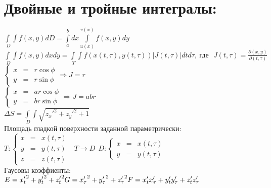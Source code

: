 \documentclass[12pt, a6paper]{extarticle}
\begin{document}
 \par \- \newline
\newpage
\section{Двойные и тройные интегралы:}
$\displaystyle \int\limits_{ \ D}\!\!\!\!\int{f(x,y)dD} = \int\limits_a^b{dx}\int\limits_{u(x)}^{v(x)}{f(x,y) dy} $ \\
$\displaystyle \int\limits_{ \ D}\!\!\!\!\int{f(x,y)dxdy} = \int\limits_{ \ T}\!\!\!\!\int{f(x(t,\tau),y(t,\tau))\left|J(t,\tau)\right|dtd\tau},\ \text{где}\ \ \ J(t,\tau) = \frac{\partial(x,y)}{\partial(t,\tau)} $ \\
$\displaystyle \left\{ \begin{array}{lll}
        									x & = & r\cos \phi \\
				             			y & = & r\sin \phi
					           \end{array}
							 \right. \Rightarrow J = r$ \\
$\displaystyle \left\{ \begin{array}{lll}
        									x & = & ar\cos \phi \\
				             			y & = & br\sin \phi
					           \end{array}
							 \right. \Rightarrow J = abr$ \\
$\displaystyle \Delta S = \int\limits_{ \ D}\!\!\!\!\int{\sqrt{{z_x'}^2+{z_y'}^2+1}} $ \\	
Площадь гладкой поверхности заданной параметрически: \\
$\displaystyle  T: \left\{ \begin{array}{lll}
        									x & = & x(t,\tau) \\
				             			y & = & y(t,\tau) \\
				             			z & = & z(t,\tau)
					           \end{array}
							 \right.\ \ \ T\rightarrow D \ \ D: \left\{ \begin{array}{lll}
        									x & = & x(t,\tau) \\
				             			y & = & y(t,\tau)
				           \end{array}
							 \right.$ \\
Гаусовы коэффиенты: \\ 
$E={x_t'}^2+{y_t'}^2+{z_t'}^2 \\
G={x_{\tau}'}^2+{y_{\tau}'}^2+{z_{\tau}'}^2 \\
F=x_t'x_{\tau}'+y_t'y_{\tau}'+z_t'z_{\tau}'$ \\
\end{document}
